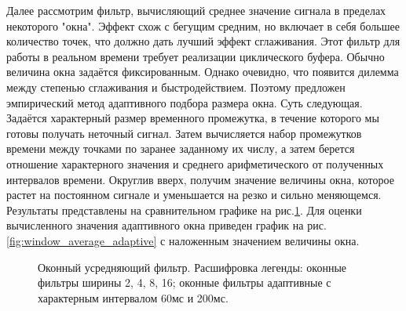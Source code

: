 \documentclass[14pt,a4paper,russian]{scrartcl}
\begin{document}
Далее рассмотрим фильтр, вычисляющий среднее значение сигнала в пределах некоторого
"окна". Эффект схож с бегущим средним, но включает в себя большее количество точек,
что должно дать лучший эффект сглаживания. Этот фильтр для работы в реальном времени требует 
реализации циклического буфера. Обычно величина окна задаётся фиксированным. Однако
очевидно, что появится дилемма между степенью сглаживания и быстродействием.
Поэтому предложен эмпирический метод адаптивного подбора размера окна. Суть следующая.
Задаётся характерный размер временного промежутка, в течение которого мы готовы
получать неточный сигнал. Затем вычисляется набор промежутков времени между 
точками по заранее заданному их числу, а затем берется отношение характерного значения
и среднего арифметического от полученных интервалов времени. Округлив вверх, получим
значение величины окна, которое растет на постоянном сигнале и уменьшается на
резко и сильно меняющемся. Результаты представлены на сравнительном графике 
на рис.\ref{fig:window_average_filter}. Для оценки вычисленного значения адаптивного окна
приведен график на рис.\ref{fig:window_average_adaptive} с наложенным значением величины окна.

\begin{figure}[h!]
    \caption{Оконный усредняющий фильтр. Расшифровка легенды: оконные фильтры
    ширины 2, 4, 8, 16; оконные фильтры адаптивные с характерным интервалом
    60мс и 200мс. }
    \label{fig:window_average_filter}
\end{figure}
\end{document}
